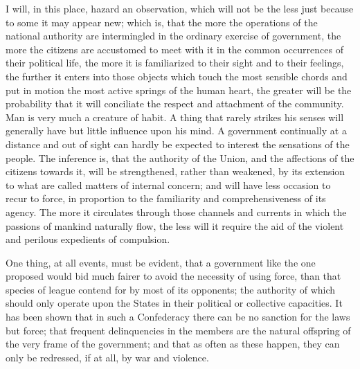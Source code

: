 I will, in this place, hazard an observation, which will not be the less just because to some it may appear new; which is, that the more the operations of the national authority are intermingled in the ordinary exercise of government, the more the citizens are accustomed to meet with it in the common occurrences of their political life, the more it is familiarized to their sight and to their feelings, the further it enters into those objects which touch the most sensible chords and put in motion the most active springs of the human heart, the greater will be the probability that it will conciliate the respect and attachment of the community. Man is very much a creature of habit. A thing that rarely strikes his senses will generally have but little influence upon his mind. A government continually at a distance and out of sight can hardly be expected to interest the sensations of the people. The inference is, that the authority of the Union, and the affections of the citizens towards it, will be strengthened, rather than weakened, by its extension to what are called matters of internal concern; and will have less occasion to recur to force, in proportion to the familiarity and comprehensiveness of its agency. The more it circulates through those channels and currents in which the passions of mankind naturally flow, the less will it require the aid of the violent and perilous expedients of compulsion.

One thing, at all events, must be evident, that a government like the one proposed would bid much fairer to avoid the necessity of using force, than that species of league contend for by most of its opponents; the authority of which should only operate upon the States in their political or collective capacities. It has been shown that in such a Confederacy there can be no sanction for the laws but force; that frequent delinquencies in the members are the natural offspring of the very frame of the government; and that as often as these happen, they can only be redressed, if at all, by war and violence.

